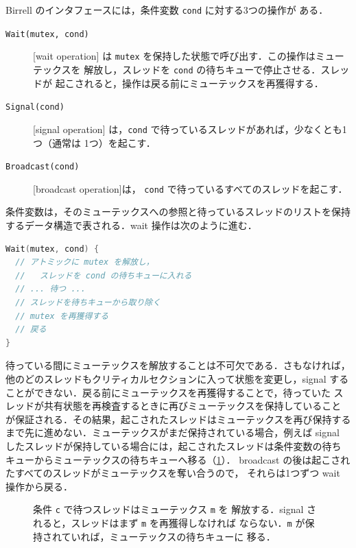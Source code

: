 \documentclass[../main.tex]{subfiles}
\begin{document}
Birrell のインタフェースには，条件変数 \texttt{cond} に対する3つの操作が
ある．
\begin{description}
  \item[\texttt{Wait(mutex, cond)}] [wait operation]%
    は \texttt{mutex} を保持した状態で呼び出す．この操作はミューテックスを
    解放し，スレッドを \texttt{cond} の待ちキューで停止させる．スレッドが
    起こされると，操作は戻る前にミューテックスを再獲得する．
  \item[\texttt{Signal(cond)}] [signal operation]%
    は，\texttt{cond} で待っているスレッドがあれば，少なくとも1つ（通常は
    1つ）を起こす．
  \item[\texttt{Broadcast(cond)}]
    [broadcast operation]は，
    \texttt{cond} で待っているすべてのスレッドを起こす．
\end{description}

条件変数は，そのミューテックスへの参照と待っているスレッドのリストを保持
するデータ構造で表される．wait 操作は次のように進む．
\begin{lstlisting}[language=C, numbers=none]
Wait(mutex, cond) {
  // アトミックに mutex を解放し，
  //   スレッドを cond の待ちキューに入れる
  // ... 待つ ...
  // スレッドを待ちキューから取り除く
  // mutex を再獲得する
  // 戻る
}
\end{lstlisting}
待っている間にミューテックスを解放することは不可欠である．さもなければ，
他のどのスレッドもクリティカルセクションに入って状態を変更し，signal する
ことができない．戻る前にミューテックスを再獲得することで，待っていた
スレッドが共有状態を再検査するときに再びミューテックスを保持していること
が保証される．その結果，起こされたスレッドはミューテックスを再び保持する
まで先に進めない．ミューテックスがまだ保持されている場合，例えば signal
したスレッドが保持している場合には，起こされたスレッドは条件変数の待ち
キューからミューテックスの待ちキューへ移る（\cref{fig:l03-cv-queues}）．
broadcast の後は起こされたすべてのスレッドがミューテックスを奪い合うので，
それらは1つずつ wait 操作から戻る．

\begin{figure}[htbp]
  \centering
  
  \caption{条件 \texttt{c} で待つスレッドはミューテックス \texttt{m} を
    解放する．signal されると，スレッドはまず \texttt{m} を再獲得しなければ
    ならない．\texttt{m} が保持されていれば，ミューテックスの待ちキューに
    移る．}
  \label{fig:l03-cv-queues}
\end{figure}
\end{document}
